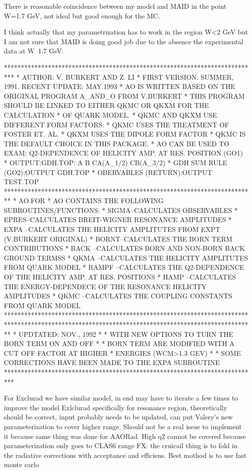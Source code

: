 There is reasonable coincidence between my model and MAID in the point W=1.7 GeV, not ideal but good enough for the MC.

I think actually that my parametrization has to work in the region W<2 GeV but I am not sure that MAID is doing good job due to the absence the experimental data at W~1.7 GeV. 

***************************************************************************
*      AUTHOR:        V. BURKERT AND Z. LI
*      FIRST VERSION: SUMMER, 1991.  RECENT UPDATE: MAY.1993
* AO IS WRITTEN BASED ON THE ORIGINAL PROGRAM A_AND_O FROM V.BURKERT
* THIS PROGRAM SHOULD BE LINKED TO EITHER QKMC OR QKXM FOR THE CALCULATION
* OF QUARK MODEL.  
* QKMC AND QKXM USE DIFFERENT FORM FACTORS:
* QKMC USES THE TREATMENT OF FOSTER ET. AL.
* QKXM USES THE DIPOLE FORM FACTOR 
* QKMC IS THE DEFAULT CHOICE IN THIS PACKAGE.
* AO CAN BE USED TO EXAM: Q2-DEPENDENCE OF HELICITY AMP. AT RES. POSITION (GO1)
*                         OUTPUT:GDH.TOP: A B CA(A_1/2) CB(A_3/2)
*                         GDH SUM RULE (GO2):OUTPUT GDH.TOP
*                         OBERVABLES  (RETURN):OUTPUT TEST.TOP
**************************************************************************
*           AO.FOR
* AO CONTAINS THE FOLLOWING SUBROUTINES/FUNCTIONS:
* SIGMA--CALCULATES OBSERVABLES
* EPRES--CALCULATES BREIT-WIGNER RESONANCE AMPLITUDES
* EXPA --CALCULATES THE HELICITY AMPLITUTES FROM EXPT (V.BURKERT ORIGINAL)
* BORNT--CALCULATES THE BORN TERM CONTRIBUTIONS
* BACK --CALCULATES BORN AND NON-BORN BACK GROUND TERMSS
* QKMA --CALCULATES THE HELICITY AMPLITUTES FROM QUARK MODEL
* RAMPF --CALCULATES THE Q2-DEPENDENCE OF THE HELICITY AMP. AT RES. POSITIONS
* HAMP --CALCULATES THE ENERGY-DEPENDECE OF THE RESONANCE HELICITY AMPLITUDES
* QKMC --CALCULATES THE COUPLING CONSTANTS FROM QUARK MODEL
************************************************************************
**************************************************************************
* UPDTATED: NOV., 1992
*         * WITH NEW OPTIONS TO TURN THE BORN TERM ON AND OFF
*         * BORN TERM ARE MODIFIED WITH A CUT OFF FACTOR AT HIGHER 
*           ENERGIES (WCM>1.3 GEV)
*         * SOME CORRECTIONS HAVE BEEN MADE TO THE EXPA SUBROUTINE
***************************************************************************  

    For Exclurad we have similar model, in end may have to iterate a few times to improve the model
    Exlclurad specifically for resonance region, theoretically should be correct, input probably needs to be updated, can put Valery’s new parameterization to cover higher range. Should not be a real issue to implement it because same thing was done for AAORad. High q2 cannot be covered because parameterization only goes to CLAS6 range
    FX: the cruicail thing is to fold in the radiative corrections with acceptance and efficiens. Best mothod is to use fast monte carlo


